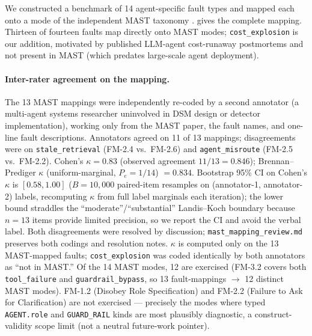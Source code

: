 \documentclass[a4paper,UKenglish,cleveref,autoref,thm-restate]{lipics-v2021}
\begin{document}
We constructed a benchmark of 14 agent-specific fault types and
mapped each onto a mode of the independent MAST taxonomy
\cite{anon-mast}.   gives the complete mapping.
Thirteen of fourteen faults map directly onto MAST modes;
\texttt{cost\_explosion} is our addition, motivated by published
LLM-agent cost-runaway postmortems and not present in MAST (which
predates large-scale agent deployment).

\paragraph*{Inter-rater agreement on the mapping.}  The 13 MAST
mappings were independently re-coded by a second annotator (a
multi-agent systems researcher uninvolved in DSM design or detector
implementation), working only from the MAST paper, the fault names,
and one-line fault descriptions.  Annotators agreed on 11 of 13
mappings; disagreements were on \texttt{stale\_retrieval} (FM-2.4
vs.\ FM-2.6) and \texttt{agent\_misroute} (FM-2.5 vs.\ FM-2.2).
Cohen's $\kappa = 0.83$ (observed agreement $11/13 = 0.846$);
Brennan--Prediger $\kappa$ \cite{brennan1981} (uniform-marginal,
$P_e = 1/14$) $= 0.834$.  Bootstrap 95\% CI on Cohen's $\kappa$ is
$[0.58, 1.00]$ ($B = 10{,}000$ paired-item resamples on
(annotator-1, annotator-2) labels, recomputing $\kappa$ from full
label marginals each iteration); the lower bound straddles the
``moderate''/``substantial'' Landis--Koch boundary because $n = 13$
items provide limited precision, so we report the CI and avoid the
verbal label.  Both disagreements were resolved by discussion;
\texttt{mast\_mapping\_review.md} preserves both codings and
resolution notes.  $\kappa$ is computed only on the 13 MAST-mapped
faults; \texttt{cost\_explosion} was coded identically by both
annotators as ``not in MAST.''  Of the 14 MAST modes, 12 are
exercised (FM-3.2 covers both \texttt{tool\_failure} and
\texttt{guardrail\_bypass}, so 13 fault-mappings $\to$ 12 distinct
MAST modes).  FM-1.2 (Disobey Role Specification) and FM-2.2
(Failure to Ask for Clarification) are not exercised --- precisely
the modes where typed \texttt{AGENT.role} and \texttt{GUARD\_RAIL}
kinds are most plausibly diagnostic, a construct-validity scope
limit (not a neutral future-work pointer).
\end{document}
